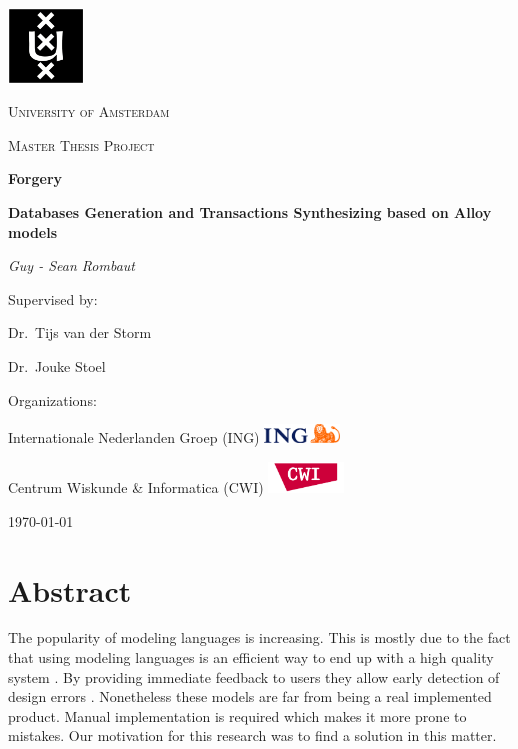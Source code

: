 \documentclass[oneside]{book}
\begin{document}
\begin{titlepage}
	\centering
	\includegraphics[width=0.15\textwidth]{logo-uva}\par\vspace{2.5mm}
	{\scshape\LARGE University of Amsterdam \par}
	\vspace{2mm}
	{\scshape\Large Master Thesis Project\par}
	\vspace{1.5cm}
	{\Huge\bfseries Forgery\par}
	{\huge\bfseries Databases Generation and Transactions Synthesizing based on Alloy models\par}
	\vspace{1cm}
	{\Large\itshape Guy - Sean Rombaut\par}
	\vfill
	Supervised by:\par
	Dr.~Tijs van der Storm\par
	Dr.~Jouke Stoel\par
	\vspace{1cm}
	Organizations:\par
		 Internationale Nederlanden Groep (ING) \hfill  \includegraphics[width=0.15\textwidth]{ING}\par
	 Centrum Wiskunde \& Informatica (CWI)  \hfill  \includegraphics[width=0.15\textwidth]{CWIlogo}

	\vfill

	{\large \today\par}
\end{titlepage}

\tableofcontents
\newpage

\chapter{Abstract}
The popularity of modeling languages is increasing. This is mostly due to the fact that using modeling languages is an efficient way to end up with a high quality system \cite[p. ~6]{abstractions}. By providing immediate feedback to users they allow early detection of design errors \cite{lightning}. Nonetheless these models are far from being a real implemented product. Manual implementation is required which makes it more prone to mistakes. Our motivation for this research was to find a solution in this matter.\\
\end{document}
